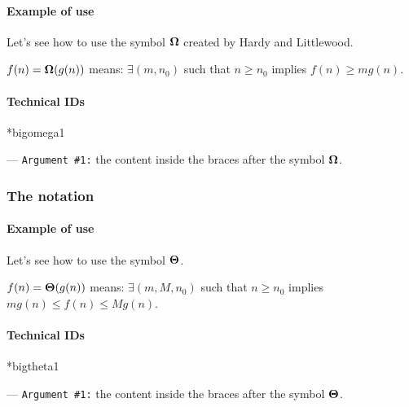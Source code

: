 \documentclass[12pt,a4paper]{article}
\makeatletter
\newcommand\IDmacro{\@ifstar{\@IDmacroStar}{\@IDmacroNoStar}}
\newcommand\@IDmacroNoStar[3]{%
        \texttt{%
        	\textbackslash#1%
        	\IfStrEq{#2}{0}{}{%
        		\,\,[#2 Option%
				\IfStrEq{#2}{1}{}{s}]%
			}%
    	    \,\,(#3 Argument%
				\IfStrEq{#3}{1}{}{s})%
	   	}
        \immediate\write\tempfile{macro@#1@#2@#3}%
    }
\newcommand\@IDmacroStar[2]{%
        \@IDmacroNoStar{#1}{0}{#2}%
    }
\newcommand\@IDoptarg[2]{%
    	\vspace{0.5em}
		--- \texttt{#1 \##2:}%
	}
\newcommand\IDarg[1]{%
    	\@IDoptarg{Argument}{#1}%
	}
\makeatother
\begin{document}
		\paragraph{Example of use}

\begin{tcblisting}{}
Let's see how to use the symbol $\bigomega{}$ created by Hardy and Littlewood.

$f(n) = \bigomega{g(n)}$ means: $\exists (m, n_0)$ such that
$n \geqslant n_0$ implies $f(n) \geqslant m g(n)$.
\end{tcblisting}


		\paragraph{Technical IDs}

\IDmacro*{bigomega}{1}

\IDarg{1} the content inside the braces after the symbol $\bigomega{}$.



    \subsubsection{\texorpdfstring{The \textTheta{} notation}%
                               {The "big Theta" notation}}

		\paragraph{Example of use}

\begin{tcblisting}{}
Let's see how to use the symbol $\bigtheta{}$.

$f(n) = \bigtheta{g(n)}$ means: $\exists (m, M, n_0)$ such that
$n \geqslant n_0$ implies $m g(n) \leqslant f(n) \leqslant M g(n)$.
\end{tcblisting}


		\paragraph{Technical IDs}

\IDmacro*{bigtheta}{1}

\IDarg{1} the content inside the braces after the symbol $\bigtheta{}$.
\end{document}
